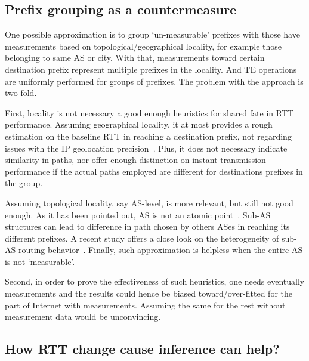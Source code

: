 \subsection{Prefix grouping as a countermeasure}
One possible approximation is to group `un-measurable' prefixes with those have measurements based on topological/geographical locality, for example those belonging to same AS or city. With that, measurements toward certain destination prefix represent multiple prefixes in the locality. And TE operations are uniformly performed for groups of prefixes.
The problem with the approach is two-fold. 

First, locality is not necessary a good enough heuristics for shared fate in RTT performance. 
Assuming geographical locality, it at most provides a rough estimation on the baseline RTT in reaching a destination prefix, not regarding issues with the IP geolocation precision~\cite{Poese2011}. Plus, it does not necessary indicate similarity in paths, nor offer enough distinction on instant transmission performance if the actual paths employed are different for destinations prefixes in the group.

Assuming topological locality, say AS-level, is more relevant, but still not good enough.
As it has been pointed out, AS is not an atomic point~\cite{Muhlbauer2006}. Sub-AS structures can lead to difference in path chosen by others ASes in reaching its different prefixes. A recent study offers a close look on the heterogeneity of sub-AS routing behavior~\cite{Lee2016}. Finally, such approximation is helpless when the entire AS is not `measurable'.

Second, in order to prove the effectiveness of such heuristics, one needs eventually measurements and the results could hence be biased toward/over-fitted for the part of Internet with measurements. Assuming the same for the rest without measurement data would be unconvincing.

\subsection{How RTT change cause inference can help?}

